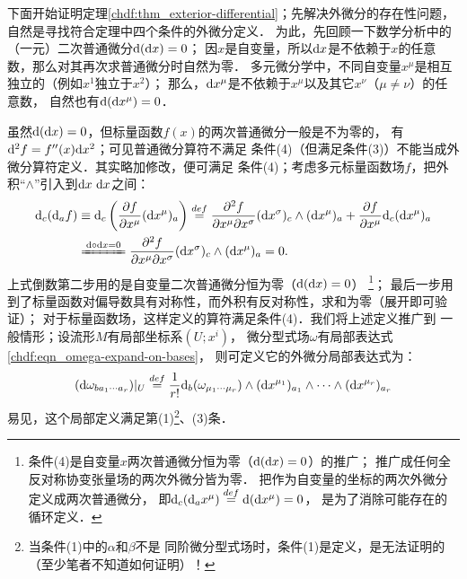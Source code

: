 下面开始证明定理\ref{chdf:thm_exterior-differential}；先解决外微分的存在性问题，
自然是寻找符合定理中四个条件的外微分定义．
为此，先回顾一下数学分析中的（一元）二次普通微分${\rm d}({\rm d}x)=0$；
因$x$是自变量，所以${\rm d}x$是不依赖于$x$的任意数，那么对其再次求普通微分时自然为零．
多元微分学中，不同自变量$x^\mu$是相互独立的（例如$x^1$独立于$x^2$）；
那么，${\rm d}x^\mu$是不依赖于$x^\mu$以及其它$x^\nu$（$\mu \neq \nu$）的任意数，
自然也有${\rm d}({\rm d}x^\mu)=0$．

虽然${\rm d}({\rm d}x)=0$，但标量函数$f(x)$的两次普通微分一般是不为零的，
有${\rm d}^2f=f''(x) {\rm d}x^2$；可见普通微分算符不满足
条件(4)（但满足条件(3)）不能当成外微分算符定义．其实略加修改，便可满足
条件(4)；考虑多元标量函数场$f$，把外积“$\wedge$”引入到${\rm d}x\ {\rm d}x$之间：
\begin{align}
    {\rm d}_{c}({\rm d}_{a}f)&\equiv {\rm d}_{c}\left(\frac{\partial f}{\partial x^\mu} ({\rm d}x^{\mu})_{a}\right)
    \overset{def}{=}\frac{\partial^2 f}{\partial x^\mu \partial x^\sigma}
    ({\rm d}x^{\sigma})_{c}\wedge ({\rm d}x^{\mu})_{a} +
    \frac{\partial f}{\partial x^\mu} {\rm d}_{c}({\rm d}x^{\mu})_{a} \notag \\
    &\xlongequal{{\rm d}\circ{\rm d}x=0}
    \frac{\partial^2 f}{\partial x^\mu \partial x^\sigma}
    ({\rm d}x^{\sigma})_{c}\wedge ({\rm d}x^{\mu})_{a} = 0. \label{chdf:eqn_ddf=0}
\end{align}
上式倒数第二步用的是自变量二次普通微分恒为零（${\rm d}({\rm d}x)=0$）
{\footnote{条件(4)是自变量$x$两次普通微分恒为零（${\rm d}({\rm d}x)=0$）的推广；
    推广成任何全反对称协变张量场的两次外微分皆为零．
    把作为自变量的坐标的两次外微分定义成两次普通微分，
即${\rm d}_{c}({\rm d}_{a}x^\mu) \overset{def}{=} {\rm d}({\rm d}x^\mu) =0$，
是为了消除可能存在的循环定义．}}；
最后一步用到了标量函数对偏导数具有对称性，而外积有反对称性，求和为零（展开即可验证）；
对于标量函数场，这样定义的算符满足条件(4)．我们将上述定义推广到
一般情形；设流形$M$有局部坐标系$(U;x^i)$，
微分型式场$\omega$有局部表达式\eqref{chdf:eqn_omega-expand-on-bases}，
则可定义它的外微分局部表达式为：
\begin{equation}\label{chdf:eqn_exterior-differential}
    ({\rm d}\omega_{b a_{1}\cdots a_{r}})|_U \overset{def}{=}
    \frac{1}{r!} {\rm d}_{b}(\omega_{\mu_{1}\cdots \mu_{r}}) \wedge
    ({\rm d}x^{\mu_1})_{a_{1}} \wedge\cdots\wedge ({\rm d}x^{\mu_r})_{a_{r}}
\end{equation}
易见，这个局部定义满足第(1){\footnote{当条件(1)中的$\alpha$和$\beta$不是
同阶微分型式场时，条件(1)是定义，是无法证明的（至少笔者不知道如何证明）！}}、(3)条．

